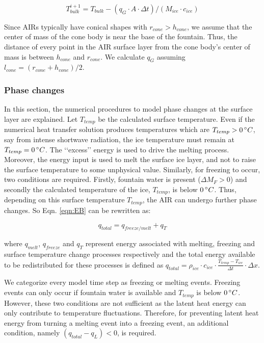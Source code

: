 \documentclass[utf8]{frontiersSCNS}
\begin{document}
\begin{equation} T_{bulk}^{i+1} = T_{bulk} - (q_{G} \cdot A \cdot \Delta t)/(M_{ice} \cdot c_{ice}) \end{equation}

Since AIRs typically have conical shapes with $r_{cone} > h_{cone}$, we assume that the center of mass of the cone
body is near the base of the fountain. Thus, the distance of every point in the AIR surface layer from the cone
body's center of mass is between $h_{cone}$ and $r_{cone}$. We calculate $q_{G}$ assuming $l_{cone} = (r_{cone} +
	h_{cone})/2$.

\subsubsection{Phase changes}

In this section, the numerical procedures to model phase changes at the surface layer are explained. Let
$T_{temp}$ be the calculated surface temperature. Even if the numerical heat transfer solution produces
temperatures which are $T_{temp}>0\, \degree C$, say from intense shortwave radiation, the ice temperature must
remain at $T_{temp} = 0\, \degree C$. The ‘‘excess’’ energy is used to drive the melting process. Moreover, the
energy input is used to melt the surface ice layer, and not to raise the surface temperature to some unphysical
value. Similarly, for freezing to occur, two conditions are required. Firstly, fountain water is present
($\Delta M_{F} > 0 $) and secondly the calculated temperature of the ice, $T_{temp}$, is below $0\, \degree C$.
Thus, depending on this surface temperature $T_{temp}$, the AIR can undergo further phase changes. So Eqn.
\ref{eqn:EB} can be rewritten as:

\begin{equation}
	q_{total}= q_{freeze/melt} + q_{T}
\end{equation}

where $q_{melt}$, $q_{freeze}$ and $q_{T}$ represent energy associated with melting, freezing and surface
temperature change processes respectively and the total energy available to be redistributed for these processes
is defined as $q_{total}=\rho_{ice} \cdot c_{ice} \cdot \frac{T_{temp}-T_{ice}}{\Delta t} \cdot \Delta x$.

We categorize every model time step as freezing or melting events. Freezing events can only occur if fountain
water is available and $T_{temp}$ is below $0\,\degree C$. However, these two conditions are not sufficient as
the latent heat energy can only contribute to temperature fluctuations. Therefore, for preventing latent heat
energy from turning a melting event into a freezing event, an additional condition, namely $(q_{total}-q_{L}) <
0$, is required.
\end{document}
